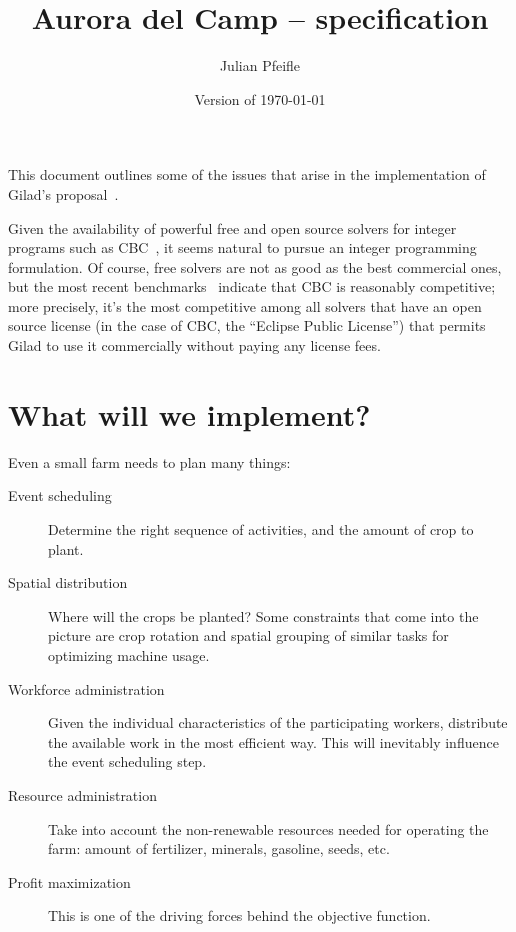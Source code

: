 \documentclass[11pt,reqno]{amsart}
\numberwithin{equation}{section}
\begin{document}
\renewcommand*\descriptionlabel[1]{%
\hspace\labelsep\normalfont\itshape #1:}

\newenvironment{mydesc}{%
  \begin{description}\setlength{\itemsep}{1ex}}%
  {\end{description}}

\title{Aurora del Camp -- specification}
\author{Julian Pfeifle}
\date{Version of \today}
\maketitle

This document outlines some of the issues that arise in the
implementation of Gilad's proposal~\cite{buzi11}.

\medskip
Given the availability of powerful free and open source solvers for
integer programs such as CBC~\cite{cbc}, it seems natural to pursue an
integer programming formulation. Of course, free solvers are not as
good as the best commercial ones, but the most recent
benchmarks~\cite{mittelmann11} indicate that CBC is reasonably
competitive; more precisely, it's the most competitive among all
solvers that have an open source license (in the case of CBC, the
``Eclipse Public License'') that permits Gilad to use it commercially
without paying any license fees.

\section{What will we implement?}

Even a small farm needs to plan many things:


\begin{description}

\item[Event scheduling] Determine the right sequence of activities, and the amount
  of crop to plant.

\item[Spatial distribution] Where will the crops be planted? Some constraints that come
  into the picture are crop rotation and spatial grouping of similar tasks for optimizing
  machine usage.

\item[Workforce administration] Given the individual characteristics of the participating
  workers, distribute the available work in the most efficient way. This will inevitably
  influence the event scheduling step.

\item[Resource administration] Take into account the non-renewable resources needed for
  operating the farm: amount of fertilizer, minerals, gasoline, seeds, etc.

\item[Profit maximization] This is one of the driving forces behind the objective function.

\end{description}
\end{document}
